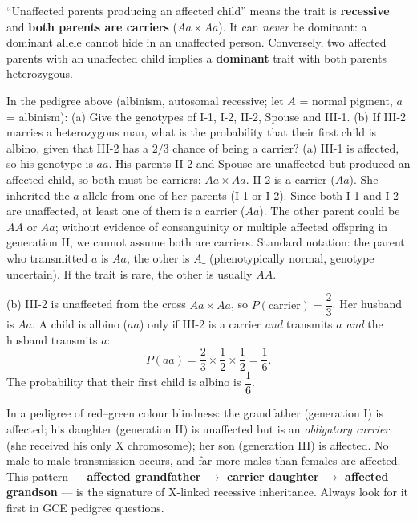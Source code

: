 \documentclass[11pt]{article}
\begin{document}
\begin{attention}
``Unaffected parents producing an affected child'' means the trait is \textbf{recessive} and \textbf{both parents are carriers} ($Aa \times Aa$). It can \emph{never} be dominant: a dominant allele cannot hide in an unaffected person. Conversely, two affected parents with an unaffected child implies a \textbf{dominant} trait with both parents heterozygous.
\end{attention}

\begin{exoresolu}
In the pedigree above (albinism, autosomal recessive; let $A$ = normal pigment, $a$ = albinism): (a) Give the genotypes of I-1, I-2, II-2, Spouse and III-1. (b) If III-2 marries a heterozygous man, what is the probability that their first child is albino, given that III-2 has a $2/3$ chance of being a carrier?
\tcblower
(a) III-1 is affected, so his genotype is $aa$. His parents II-2 and Spouse are unaffected but produced an affected child, so both must be carriers: $Aa \times Aa$. 
II-2 is a carrier ($Aa$). She inherited the $a$ allele from one of her parents (I-1 or I-2). Since both I-1 and I-2 are unaffected, at least one of them is a carrier ($Aa$). The other parent could be $AA$ or $Aa$; without evidence of consanguinity or multiple affected offspring in generation II, we cannot assume both are carriers. Standard notation: the parent who transmitted $a$ is $Aa$, the other is $A\_$ (phenotypically normal, genotype uncertain). If the trait is rare, the other is usually $AA$.

(b) III-2 is unaffected from the cross $Aa \times Aa$, so $P(\text{carrier}) = \dfrac{2}{3}$. Her husband is $Aa$. A child is albino ($aa$) only if III-2 is a carrier \emph{and} transmits $a$ \emph{and} the husband transmits $a$:
\[
P(aa) = \frac{2}{3} \times \frac{1}{2} \times \frac{1}{2} = \frac{1}{6}.
\]
The probability that their first child is albino is $\boxed{\dfrac{1}{6}}$.
\end{exoresolu}

\begin{exemplebox}
In a pedigree of red--green colour blindness: the grandfather (generation I) is affected; his daughter (generation II) is unaffected but is an \emph{obligatory carrier} (she received his only X chromosome); her son (generation III) is affected. No male-to-male transmission occurs, and far more males than females are affected. This pattern --- \textbf{affected grandfather $\rightarrow$ carrier daughter $\rightarrow$ affected grandson} --- is the signature of X-linked recessive inheritance. Always look for it first in GCE pedigree questions.
\end{exemplebox}
\end{document}
